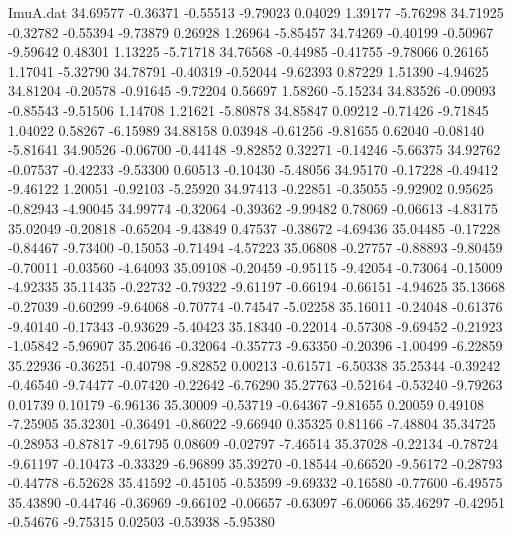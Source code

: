 \begin{filecontents}{ImuA.dat}
  34.69577   -0.36371   -0.55513   -9.79023    0.04029    1.39177   -5.76298
  34.71925   -0.32782   -0.55394   -9.73879    0.26928    1.26964   -5.85457
  34.74269   -0.40199   -0.50967   -9.59642    0.48301    1.13225   -5.71718
  34.76568   -0.44985   -0.41755   -9.78066    0.26165    1.17041   -5.32790
  34.78791   -0.40319   -0.52044   -9.62393    0.87229    1.51390   -4.94625
  34.81204   -0.20578   -0.91645   -9.72204    0.56697    1.58260   -5.15234
  34.83526   -0.09093   -0.85543   -9.51506    1.14708    1.21621   -5.80878
  34.85847    0.09212   -0.71426   -9.71845    1.04022    0.58267   -6.15989
  34.88158    0.03948   -0.61256   -9.81655    0.62040   -0.08140   -5.81641
  34.90526   -0.06700   -0.44148   -9.82852    0.32271   -0.14246   -5.66375
  34.92762   -0.07537   -0.42233   -9.53300    0.60513   -0.10430   -5.48056
  34.95170   -0.17228   -0.49412   -9.46122    1.20051   -0.92103   -5.25920
  34.97413   -0.22851   -0.35055   -9.92902    0.95625   -0.82943   -4.90045
  34.99774   -0.32064   -0.39362   -9.99482    0.78069   -0.06613   -4.83175
  35.02049   -0.20818   -0.65204   -9.43849    0.47537   -0.38672   -4.69436
  35.04485   -0.17228   -0.84467   -9.73400   -0.15053   -0.71494   -4.57223
  35.06808   -0.27757   -0.88893   -9.80459   -0.70011   -0.03560   -4.64093
  35.09108   -0.20459   -0.95115   -9.42054   -0.73064   -0.15009   -4.92335
  35.11435   -0.22732   -0.79322   -9.61197   -0.66194   -0.66151   -4.94625
  35.13668   -0.27039   -0.60299   -9.64068   -0.70774   -0.74547   -5.02258
  35.16011   -0.24048   -0.61376   -9.40140   -0.17343   -0.93629   -5.40423
  35.18340   -0.22014   -0.57308   -9.69452   -0.21923   -1.05842   -5.96907
  35.20646   -0.32064   -0.35773   -9.63350   -0.20396   -1.00499   -6.22859
  35.22936   -0.36251   -0.40798   -9.82852    0.00213   -0.61571   -6.50338
  35.25344   -0.39242   -0.46540   -9.74477   -0.07420   -0.22642   -6.76290
  35.27763   -0.52164   -0.53240   -9.79263    0.01739    0.10179   -6.96136
  35.30009   -0.53719   -0.64367   -9.81655    0.20059    0.49108   -7.25905
  35.32301   -0.36491   -0.86022   -9.66940    0.35325    0.81166   -7.48804
  35.34725   -0.28953   -0.87817   -9.61795    0.08609   -0.02797   -7.46514
  35.37028   -0.22134   -0.78724   -9.61197   -0.10473   -0.33329   -6.96899
  35.39270   -0.18544   -0.66520   -9.56172   -0.28793   -0.44778   -6.52628
  35.41592   -0.45105   -0.53599   -9.69332   -0.16580   -0.77600   -6.49575
  35.43890   -0.44746   -0.36969   -9.66102   -0.06657   -0.63097   -6.06066
  35.46297   -0.42951   -0.54676   -9.75315    0.02503   -0.53938   -5.95380

\end{filecontents}
